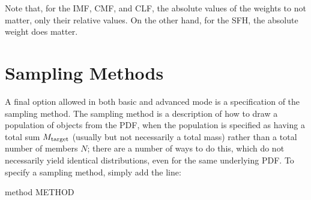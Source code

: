 \documentclass[letterpaper,10pt,english]{sphinxmanual}
\begin{document}
Note that, for the IMF, CMF, and CLF, the absolute values of the weights to not matter, only their relative values. On the other hand, for the SFH, the absolute weight does matter.


\section{Sampling Methods}
\label{\detokenize{pdfs:sampling-methods}}\label{\detokenize{pdfs:sampling-metod-label}}
A final option allowed in both basic and advanced mode is a specification of the sampling method. The sampling method is a description of how to draw a population of objects from the PDF, when the population is specified as having a total sum \(M_{\rm target}\) (usually but not necessarily a total mass) rather than a total number of members \(N\); there are a number of ways to do this, which do not necessarily yield identical distributions, even for the same underlying PDF. To specify a sampling method, simply add the line:

\begin{sphinxVerbatim}[commandchars=\\\{\}]
method METHOD
\end{sphinxVerbatim}
\end{document}
